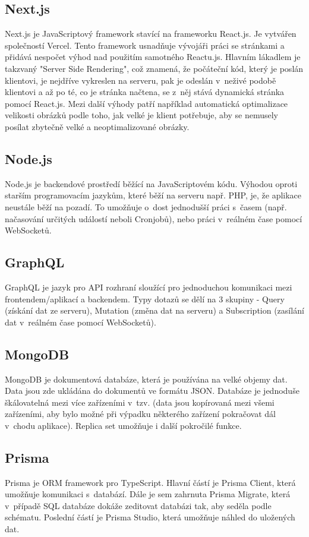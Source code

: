 \subsection{Next.js}
Next.js je JavaScriptový framework stavící na frameworku React.js. Je vytvářen společností Vercel. Tento framework usnadňuje vývojáři práci se stránkami a přidává nespočet výhod nad použitím samotného Reactu.js. Hlavním lákadlem je takzvaný "Server Side Rendering", což znamená, že počáteční kód, který je poslán klientovi, je nejdříve vykreslen na serveru, pak je odeslán v~neživé podobě klientovi a až po té, co je stránka načtena, se z~něj stává dynamická stránka pomocí React.js. Mezi další výhody patří například automatická optimalizace velikosti obrázků podle toho, jak velké je klient potřebuje, aby se nemusely posílat zbytečně velké a neoptimalizované obrázky. \cite{Next}

\subsection{Node.js}
Node.js je backendové prostředí běžící na JavaScriptovém kódu. Výhodou oproti starším programovacím jazykům, které běží na serveru např. PHP, je, že aplikace neustále běží na pozadí. To umožňuje o~dost jednodušší práci s~časem (např. načasování určitých událostí neboli Cronjobů), nebo práci v~reálném čase pomocí WebSocketů. \cite{Node}

\subsection{GraphQL}
GraphQL je jazyk pro API rozhraní sloužící pro jednoduchou komunikaci mezi frontendem/aplikací a backendem. Typy dotazů se dělí na 3 skupiny - Query (získání dat ze serveru), Mutation (změna dat na serveru) a Subscription (zasílání dat v~reálném čase pomocí WebSocketů). \cite{GraphQL}

\subsection{MongoDB}
MongoDB je dokumentová databáze, která je používána na velké objemy dat. Data jsou zde ukládána do dokumentů ve formátu JSON. Databáze je jednoduše škálovatelná mezi více zařízeními v~tzv.  (data jsou kopírovaná mezi všemi zařízeními, aby bylo možné při výpadku některého zařízení pokračovat dál v~chodu aplikace). Replica set umožňuje i další pokročilé funkce. \cite{MongoDB}

\subsection{Prisma}
Prisma je ORM framework pro TypeScript. Hlavní částí je Prisma Client, která umožňuje komunikaci s~databází. Dále je sem zahrnuta Prisma Migrate, která v~případě SQL databáze dokáže zeditovat databázi tak, aby seděla podle schématu. Poslední částí je Prisma Studio, která umožňuje náhled do uložených dat.\cite{Prisma}

